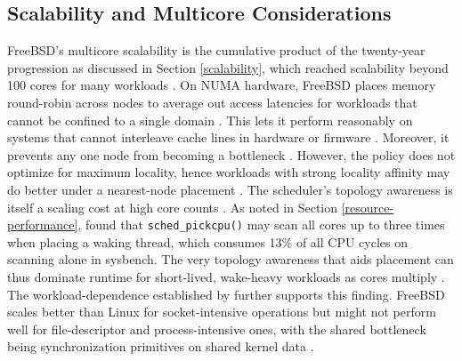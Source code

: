 \subsection{Scalability and Multicore Considerations} \label{concurrency-scalability} %

FreeBSD's multicore scalability is the cumulative product of the twenty-year progression as discussed in Section
\ref{scalability}, which reached scalability beyond 100 cores for many workloads \parencite{freebsd_vs_dragonfly}.
On NUMA hardware, FreeBSD places memory round-robin across nodes to average out access latencies for workloads that
cannot be confined to a single domain \parencite{lameter2013}. This lets it perform reasonably on systems that cannot
interleave cache lines in hardware or firmware \parencite{lameter2013}. Moreover, it prevents any one node from becoming
a bottleneck \parencite{lameter2013}. However, the policy does not optimize for maximum locality, hence workloads
with strong locality affinity may do better under a nearest-node placement \parencite{lameter2013}. The scheduler's topology
awareness is itself a scaling cost at high core counts \parencite{bouron2018}. As noted in Section \ref{resource-performance},
\textcite{bouron2018} found that \texttt{sched\_pickcpu()} may scan all cores up to three times when placing a
waking thread, which consumes 13\% of all CPU cycles on scanning alone in sysbench. The very topology awareness that aids
placement can thus dominate runtime for short-lived, wake-heavy workloads as cores multiply \parencite{bouron2018}. The
workload-dependence established by \textcite{cui2011} further supports this finding. FreeBSD scales better than Linux for
socket-intensive operations but might not perform well for file-descriptor and process-intensive ones, with the shared
bottleneck being synchronization primitives on shared kernel data \parencite{cui2011}.

